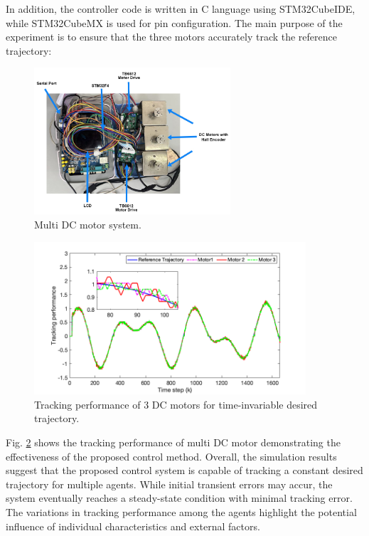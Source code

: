 \documentclass[journal,onecolumn]{IEEEtran}
\begin{document}
In addition, the controller code is written in C language using STM32CubeIDE, while STM32CubeMX is used for pin configuration. The main purpose of the experiment is to ensure that the three motors accurately track the reference trajectory:

\begin{figure}[H]
    \centering
    \includegraphics[width=0.65\textwidth]{system.jpg}
    \caption{Multi DC motor system.}
    \label{fig:system} %
\end{figure}


\begin{figure}[H]
    \centering
    \includegraphics[width=0.9\textwidth]{dataplot.png}
    \caption{Tracking performance of 3 DC motors for time-invariable desired trajectory.}
    \label{fig:output} %
\end{figure}

Fig. \ref{fig:output} shows the tracking performance of multi DC motor demonstrating the effectiveness of the proposed control method.
Overall, the simulation results suggest that the proposed control system is capable of tracking a constant desired trajectory for multiple agents. While initial transient errors may accur, the system eventually reaches a steady-state condition with minimal tracking error. The variations in tracking performance among the agents highlight the potential influence of individual characteristics and external factors.
\end{document}
